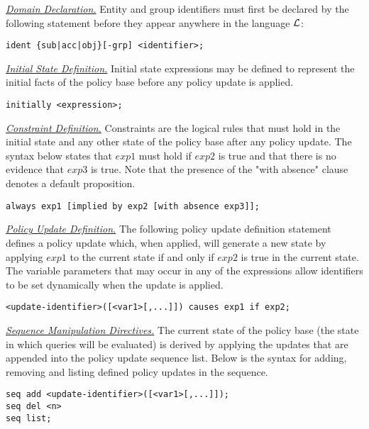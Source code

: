 \documentclass{llncs}
\begin{document}
    \noindent
    \underline{\emph{Domain Declaration.}}
    Entity and group identifiers must first be declared by the following
    statement before they appear anywhere in the language $\cal{L}$:

    \begin{verbatim}ident {sub|acc|obj}[-grp] <identifier>;\end{verbatim}

    \noindent
    \underline{\emph{Initial State Definition.}}
    Initial state expressions may be defined
    to represent the initial facts of the policy base before any policy update
    is applied.

    \begin{verbatim}initially <expression>;\end{verbatim}

    \noindent
    \underline{\emph{Constraint Definition.}}
    Constraints are the logical rules that must hold in the initial state and
    any other state of the policy base after any policy update. The syntax
    below states that $exp1$ must hold if $exp2$ is true and that there is no
    evidence that $exp3$ is true. Note that the presence of the "with absence"
    clause denotes a default proposition.

    \begin{verbatim}always exp1 [implied by exp2 [with absence exp3]];\end{verbatim}

    \noindent
    \underline{\emph{Policy Update Definition.}}
    The following policy update definition statement defines a policy update
    which, when applied, will generate a new state by applying $exp1$ to the
    current state if and only if $exp2$ is true in the current state. The
    variable parameters that may occur in any of the expressions allow
    identifiers to be set dynamically when the update is applied.

    \begin{verbatim}<update-identifier>([<var1>[,...]]) causes exp1 if exp2;\end{verbatim}

    \noindent
    \underline{\emph{Sequence Manipulation Directives.}}
    The current state of the policy base (the state in which queries will be
    evaluated) is derived by applying the updates that are appended into the
    policy update sequence list. Below is the syntax for adding, removing and
    listing defined policy updates in the sequence.

\begin{verbatim}
seq add <update-identifier>([<var1>[,...]]);
seq del <n>
seq list;
\end{verbatim}
\end{document}
